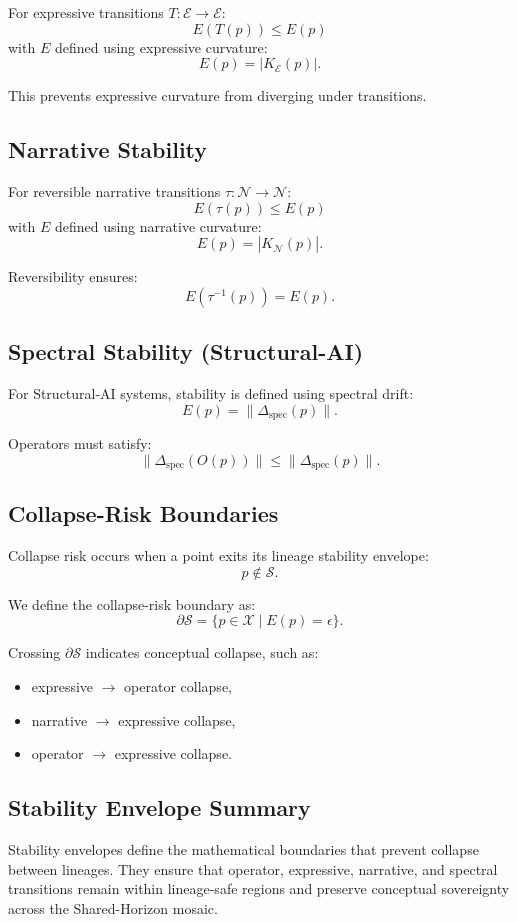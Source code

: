 For expressive transitions $T : \mathcal{E} \rightarrow \mathcal{E}$:
\[
E(T(p)) \le E(p)
\]
with $E$ defined using expressive curvature:
\[
E(p) = |K_{\mathcal{E}}(p)|.
\]

This prevents expressive curvature from diverging under transitions.

\subsection{Narrative Stability}

For reversible narrative transitions $\tau : \mathcal{N} \rightarrow \mathcal{N}$:
\[
E(\tau(p)) \le E(p)
\]
with $E$ defined using narrative curvature:
\[
E(p) = |K_{\mathcal{N}}(p)|.
\]

Reversibility ensures:
\[
E(\tau^{-1}(p)) = E(p).
\]

\subsection{Spectral Stability (Structural-AI)}

For Structural-AI systems, stability is defined using spectral drift:
\[
E(p) = \| \Delta_{\text{spec}}(p) \|.
\]

Operators must satisfy:
\[
\| \Delta_{\text{spec}}(O(p)) \| \le \| \Delta_{\text{spec}}(p) \|.
\]

\subsection{Collapse-Risk Boundaries}

Collapse risk occurs when a point exits its lineage stability envelope:
\[
p \notin \mathcal{S}.
\]

We define the collapse-risk boundary as:
\[
\partial \mathcal{S} = \{ p \in \mathcal{X} \mid E(p) = \epsilon \}.
\]

Crossing $\partial \mathcal{S}$ indicates conceptual collapse, such as:

\begin{itemize}
    \item expressive $\rightarrow$ operator collapse,
    \item narrative $\rightarrow$ expressive collapse,
    \item operator $\rightarrow$ expressive collapse.
\end{itemize}

\subsection{Stability Envelope Summary}

Stability envelopes define the mathematical boundaries that prevent collapse
between lineages. They ensure that operator, expressive, narrative, and
spectral transitions remain within lineage-safe regions and preserve conceptual
sovereignty across the Shared-Horizon mosaic.
